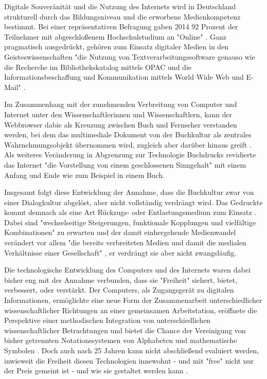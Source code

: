 Digitale Souveränität und die Nutzung des Internets wird in Deutschland strukturell durch das Bildungsniveau und die erworbene Medienkompetenz bestimmt. Bei einer repräsentativen Befragung gaben 2014 92 Prozent der Teilnehmer mit abgeschloßenem Hochschulstudium an "Online" \cite{nonliner_2014}. Ganz pragmatisch ausgedrückt, gehören zum Einsatz digitaler Medien in den Geisteswissenschaften "die Nutzung von Textverarbeitungssoftware genauso wie die Recherche im Bibliothekskatalog mittels OPAC und die Informationsbeschaffung und Kommunikation mittels World Wide Web und E-Mail" \cite{naeder_2010_open}.

Im Zusammenhang mit der zunehmenden Verbreitung von Computer und Internet unter den Wissenschaftlerinnen und Wissenschaftlern, kann der Webbrowser dabie als Kreuzung zwischen Buch und Fernseher verstanden werden, bei dem das multimediale Dokument von der Buchkultur als zentrales Wahrnehmungsobjekt übernommen wird, zugleich aber darüber hinaus greift \cite{Warnke_2011}. Als weiteres Veränderung in Abgrenzung zur Technologie Buchdrucks revidierte das Internet "die Vorstellung von einem geschlossenen Sinngehalt" \cite{sandbothe_2000_pragmatische} mit einem Anfang und Ende wie zum Beispiel in einem Buch.

Insgesamt folgt diese Entwicklung der Annahme, dass die Buchkultur zwar von einer Dialogkultur abgelöst, aber nicht vollständig verdrängt wird. Das Gedruckte kommt demnach als eine Art Rückzugs- oder Entlastungsmedium zum Einsatz \cite{hagner_2015_sache_buches}. Dabei sind "wechselseitige Steigerungen, funktionale Kopplungen und vielfältige Kombinationen" zu erwarten und der damit einhergehende Medienwandel verändert vor allem "die bereits verbreiteten Medien und damit die medialen Verhältnisse einer Gesellschaft" \cite{Koenen_1997}, er verdrängt sie aber nicht zwangsläufig.

Die technologische Entwicklung des Computers und des Internets waren dabei bisher eng mit der Annahme verbunden, dass sie "Freiheit" sichert, bietet, verbessert, oder verstärkt. Der Computers, als Zugangsgerät zu digitalen Informationen, ermöglichte eine neue Form der Zusammenarbeit unterschiedlicher wissenschaftlicher Richtungen an einer gemeinsamen Arbeitstation, eröffnete die Perspektive einer methodischen Integration von unterschiedlichen wissenschaftlicher Betrachtungen und bietet die Chance der Vereinigung von bisher getrennten Notationssystemen von Alphabeten und mathematische Symbolen \cite{kittler_2004}. Doch auch nach 25 Jahren kann nicht abschließend evaluiert werden, inwieweit die Freiheit diesen Technologien innewohnt - und mit "free" nicht nur der Preis gemeint ist \cite{stallman2002} - und wie sie gestaltet werden kann \cite{kelty_2014_freedom}.

